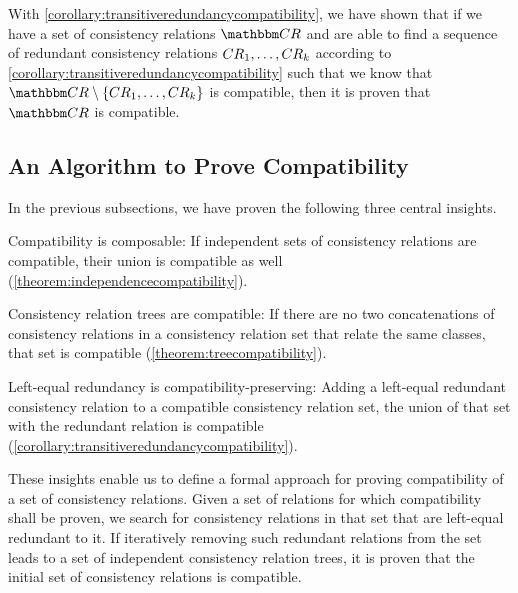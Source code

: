 With \autoref{corollary:transitiveredundancycompatibility}, we have shown that if we have a set of consistency relations $\consistencyrelationset{CR}$ and are able to find a sequence of redundant consistency relations $\consistencyrelation{CR}{1}, \dots, {\consistencyrelation{CR}{k}}$ according to \autoref{corollary:transitiveredundancycompatibility} such that we know that $\consistencyrelationset{CR} \setminus \setted{ \consistencyrelation{CR}{1}, \dots, {\consistencyrelation{CR}{k}}}$ is compatible, then it is proven that $\consistencyrelationset{CR}$ is compatible.



\subsection{An Algorithm to Prove Compatibility} %
\label{chap:compatibility:formal_approach:algorithm}

In the previous subsections, we have proven the following three central insights.
\begin{longenumerate}
    \item Compatibility is composable: If independent sets of consistency relations are compatible, their union is compatible as well (\autoref{theorem:independencecompatibility}).
    \item Consistency relation trees are compatible: If there are no two concatenations of consistency relations in a consistency relation set that relate the same classes, that set is compatible (\autoref{theorem:treecompatibility}).
    \item Left-equal redundancy is compatibility-preserving: Adding a left-equal redundant consistency relation to a compatible consistency relation set, the union of that set with the redundant relation is compatible (\autoref{corollary:transitiveredundancycompatibility}).
\end{longenumerate}

These insights enable us to define a formal approach for proving compatibility of a set of consistency relations.
Given a set of relations for which compatibility shall be proven, we search for consistency relations in that set that are left-equal redundant to it.
If iteratively removing such redundant relations from the set leads to a set of independent consistency relation trees, it is proven that the initial set of consistency relations is compatible.

